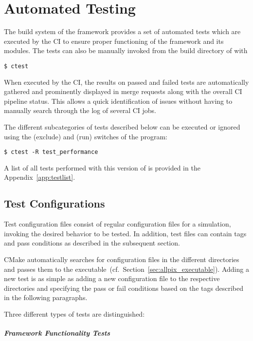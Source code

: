 \chapter{Automated Testing}
\label{ch:testing}

The build system of the framework provides a set of automated tests which are executed by the CI to ensure proper functioning of the framework and its modules.
The tests can also be manually invoked from the build directory of \apsq with
\begin{verbatim}
$ ctest
\end{verbatim}
When executed by the CI, the results on passed and failed tests are automatically gathered and prominently displayed in merge requests along with the overall CI pipeline status.
This allows a quick identification of issues without having to manually search through the log of several CI jobs.

The different subcategories of tests described below can be executed or ignored using the  (exclude) and  (run) switches of the  program:
\begin{verbatim}
$ ctest -R test_performance
\end{verbatim}

A list of all tests performed with this version of \apsq is provided in the Appendix~\ref{app:testlist}.
\section{Test Configurations}

Test configuration files consist of regular \apsq configuration files for a simulation, invoking the desired behavior to be tested.
In addition, test files can contain tags and pass conditions as described in the subsequent section.

CMake automatically searches for \apsq configuration files in the different directories and passes them to the \apsq executable~(cf.\ Section~\ref{sec:allpix_executable}).
Adding a new test is as simple as adding a new configuration file to the respective directories and specifying the pass or fail conditions based on the tags described in the following paragraphs.

Three different types of tests are distinguished:

\paragraph{Framework Functionality Tests}

